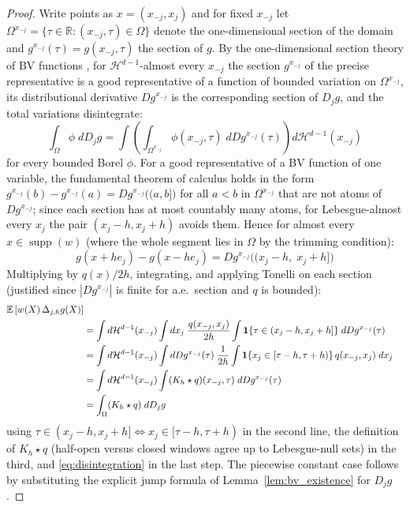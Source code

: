 \documentclass[12pt]{article}
\newcommand{\R}{\mathbb{R}}
\newcommand{\E}{\mathbb{E}}
\newcommand{\abs}[1]{\left| #1 \right|}
\newcommand{\Dh}{\Delta_{j,h}}
\begin{document}
	\begin{proof}
		Write points as $x = (x_{-j}, x_j)$ and for fixed $x_{-j}$ let
		$\Omega^{x_{-j}} = \{ \tau \in \R : (x_{-j}, \tau) \in \Omega \}$ denote the
		one-dimensional section of the domain and
		$g^{x_{-j}}(\tau) = g(x_{-j}, \tau)$ the section of $g$. By the
		one-dimensional section theory of BV functions
		\citep[Section~3.11]{ambrosio2000bv}, for $\mathcal{H}^{d-1}$-almost every
		$x_{-j}$ the section $g^{x_{-j}}$ of the precise representative is a good
		representative of a function of bounded variation on $\Omega^{x_{-j}}$, its
		distributional derivative $D g^{x_{-j}}$ is the corresponding section of
		$D_j g$, and the total variations disintegrate:
		\begin{equation}
			\int_\Omega \phi\; d D_j g
			= \int \left( \int_{\Omega^{x_{-j}}} \phi(x_{-j}, \tau)\;
			d D g^{x_{-j}}(\tau) \right) d\mathcal{H}^{d-1}(x_{-j})
			\label{eq:disintegration}
		\end{equation}
		for every bounded Borel $\phi$. For a good representative of a BV function of
		one variable, the fundamental theorem of calculus holds in the form
		$g^{x_{-j}}(b) - g^{x_{-j}}(a) = D g^{x_{-j}}\bigl((a, b]\bigr)$ for all
		$a < b$ in $\Omega^{x_{-j}}$ that are not atoms of $D g^{x_{-j}}$; since
		each section has at most countably many atoms, for
		Lebesgue-almost every $x_j$ the pair $(x_j - h, x_j + h)$ avoids them. Hence
		for almost every $x \in \operatorname{supp}(w)$ (where the whole segment lies
		in $\Omega$ by the trimming condition):
		\begin{equation}
			g(x + h e_j) - g(x - h e_j)
			= D g^{x_{-j}}\bigl((x_j - h,\; x_j + h]\bigr)
		\end{equation}
		Multiplying by $q(x)/2h$, integrating, and applying
		Tonelli on each section (justified since
		$\abs{D g^{x_{-j}}}$ is finite for a.e.\ section and $q$ is bounded):
		\begin{align}
			\E\left[w(X)\, \Dh g(X)\right] \notag \\
			&= \int d\mathcal{H}^{d-1}(x_{-j}) \int dx_j\;
			\frac{q(x_{-j}, x_j)}{2h}
			\int \mathbf{1}\{\tau \in (x_j - h, x_j + h]\}\;
			d D g^{x_{-j}}(\tau) \notag \\
			&= \int d\mathcal{H}^{d-1}(x_{-j}) \int d D g^{x_{-j}}(\tau)\;
			\frac{1}{2h} \int \mathbf{1}\{x_j \in [\tau - h, \tau + h)\}\,
			q(x_{-j}, x_j)\; dx_j \notag \\
			&= \int d\mathcal{H}^{d-1}(x_{-j}) \int (K_h \star q)(x_{-j}, \tau)\;
			d D g^{x_{-j}}(\tau) \notag \\
			&= \int_\Omega (K_h \star q)\; d D_j g
		\end{align}
		using $\tau \in (x_j - h, x_j + h] \Leftrightarrow
		x_j \in [\tau - h, \tau + h)$ in the second line, the definition of
		$K_h \star q$ (half-open versus closed windows agree up to Lebesgue-null
		sets) in the third, and \eqref{eq:disintegration} in the last step. The
		piecewise constant case follows by substituting the explicit jump formula of
		Lemma~\ref{lem:bv_existence} for $D_j g$.
		

\end{proof}
\end{document}

